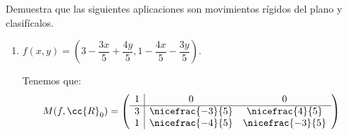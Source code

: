 \begin{ejercicio}
    Demuestra que las siguientes aplicaciones son movimientos rígidos del plano y clasifícalos.
    \begin{enumerate}
        \item $f\left(x, y\right) = \left(3 - \dfrac{3x}{5} + \dfrac{4y}{5}, 1 - \dfrac{4x}{5} - \dfrac{3y}{5}\right).$

        Tenemos que:
        \begin{equation*}
            M(f,\cc{R}_0) = \left(
            \begin{array}{c|cc}
                1 & 0 & 0 \\ \hline
                3 & \nicefrac{-3}{5} & \nicefrac{4}{5} \\
                1 & \nicefrac{-4}{5} & \nicefrac{-3}{5} \\
            \end{array}
            \right)
        \end{equation*}


\end{enumerate}
\end{ejercicio}
